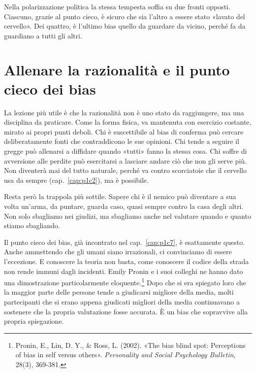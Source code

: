 
Nella polarizzazione politica la stessa tempesta soffia su due fronti opposti. Ciascuno, grazie al punto cieco, è sicuro che sia l'altro a essere stato «lavato del cervello». Dei quattro, è l'ultimo bias quello da guardare da vicino, perché fa da guardiano a tutti gli altri.

\bigskip

\section{Allenare la razionalità e il punto cieco dei bias}
\label{sec:p4c25-la-razionalita-come}

La lezione più utile è che la razionalità non è uno stato da raggiungere, ma una disciplina da praticare. Come la forma fisica, va mantenuta con esercizio costante, mirato ai propri punti deboli. Chi è suscettibile al bias di conferma può cercare deliberatamente fonti che contraddicono le sue opinioni. Chi tende a seguire il gregge può allenarsi a diffidare quando «tutti» fanno la stessa cosa. Chi soffre di avversione alle perdite può esercitarsi a lasciare andare ciò che non gli serve più. Non diventerà mai del tutto naturale, perché va contro scorciatoie che il cervello usa da sempre (cap.~\ref{cap:p1c2}), ma è possibile.

Resta però la trappola più sottile. Sapere chi è il nemico può diventare a sua volta un'arma, da puntare, guarda caso, quasi sempre contro la casa degli altri. Non solo sbagliamo nei giudizi, ma sbagliamo anche nel valutare quando e quanto stiamo sbagliando.

Il punto cieco dei bias, già incontrato nel cap.~\ref{cap:p1c7}, è esattamente questo. Anche ammettendo che gli umani siano irrazionali, ci convinciamo di essere l'eccezione. E conoscere la teoria non basta, come conoscere il codice della strada non rende immuni dagli incidenti. Emily Pronin e i suoi colleghi ne hanno dato una dimostrazione particolarmente eloquente.\footnote{Pronin, E., Lin, D. Y., \& Ross, L. (2002). «The bias blind spot: Perceptions of bias in self versus others». \textit{Personality and Social Psychology Bulletin}, 28(3), 369-381.} Dopo che si era spiegato loro che la maggior parte delle persone tende a giudicarsi migliore della media, molti partecipanti che si erano appena giudicati migliori della media continuavano a sostenere che la propria valutazione fosse accurata. È un bias che sopravvive alla propria spiegazione.

